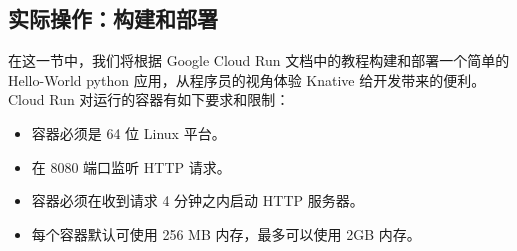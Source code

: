\documentclass[11pt]{article}
\begin{document}
\subsection{实际操作：构建和部署}
在这一节中，我们将根据 Google Cloud Run 文档中的教程\cite{cloudrun}构建和部署一个简单的 Hello-World python 应用，从程序员的视角体验 Knative 给开发带来的便利。Cloud Run 对运行的容器有如下要求和限制\cite{cloudrun_contract}：
\begin{itemize}
	\item 容器必须是 64 位 Linux 平台。
	\item 在 8080 端口监听 HTTP 请求。
	\item 容器必须在收到请求 4 分钟之内启动 HTTP 服务器。
	\item 每个容器默认可使用 256 MB 内存，最多可以使用 2GB 内存。
\end{itemize}
\end{document}
